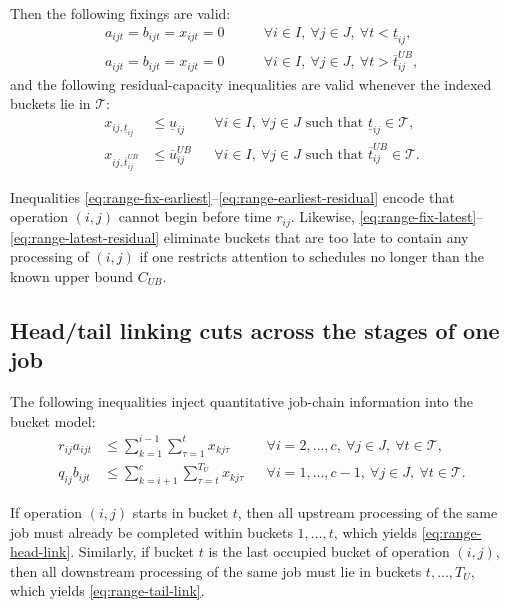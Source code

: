 \documentclass[11pt]{article}
\begin{document}
Then the following fixings are valid:
\begin{align}
a_{ijt}=b_{ijt}=x_{ijt}=0
&\qquad
\forall i\in I,\ \forall j\in J,\ \forall t<\underline t_{ij},
\label{eq:range-fix-earliest}\\
a_{ijt}=b_{ijt}=x_{ijt}=0
&\qquad
\forall i\in I,\ \forall j\in J,\ \forall t>\overline t_{ij}^{UB},
\label{eq:range-fix-latest}
\end{align}
and the following residual-capacity inequalities are valid whenever the indexed buckets lie in $\mathcal T$:
\begin{align}
x_{ij,\underline t_{ij}} &\le \underline u_{ij}
&& \forall i\in I,\ \forall j\in J\text{ such that }\underline t_{ij}\in\mathcal T,
\label{eq:range-earliest-residual}\\
x_{ij,\overline t_{ij}^{UB}} &\le \overline u_{ij}^{UB}
&& \forall i\in I,\ \forall j\in J\text{ such that }\overline t_{ij}^{UB}\in\mathcal T.
\label{eq:range-latest-residual}
\end{align}

Inequalities \eqref{eq:range-fix-earliest}--\eqref{eq:range-earliest-residual} encode that operation $(i,j)$ cannot begin before time $r_{ij}$.
Likewise, \eqref{eq:range-fix-latest}--\eqref{eq:range-latest-residual} eliminate buckets that are too late to contain any processing of $(i,j)$ if one restricts attention to schedules no longer than the known upper bound $C_{UB}$.

\subsection{Head/tail linking cuts across the stages of one job}

The following inequalities inject quantitative job-chain information into the bucket model:
\begin{align}
r_{ij} a_{ijt}
&\le
\sum_{k=1}^{i-1}\sum_{\tau=1}^{t} x_{kj\tau}
&& \forall i=2,\dots,c,\ \forall j\in J,\ \forall t\in\mathcal T,
\label{eq:range-head-link}\\
q_{ij} b_{ijt}
&\le
\sum_{k=i+1}^{c}\sum_{\tau=t}^{T_U} x_{kj\tau}
&& \forall i=1,\dots,c-1,\ \forall j\in J,\ \forall t\in\mathcal T.
\label{eq:range-tail-link}
\end{align}

If operation $(i,j)$ starts in bucket $t$, then all upstream processing of the same job must already be completed within buckets $1,\dots,t$, which yields \eqref{eq:range-head-link}.
Similarly, if bucket $t$ is the last occupied bucket of operation $(i,j)$, then all downstream processing of the same job must lie in buckets $t,\dots,T_U$, which yields \eqref{eq:range-tail-link}.
\end{document}
